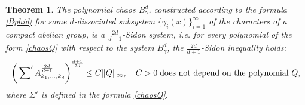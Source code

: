 \documentclass[12pt]{article}
\newtheorem{theorem}{Theorem}  %
\begin{document}
	\begin{theorem} \label{THEOREM-2} 
		The polynomial chaos $B^d_{\gamma}$, constructed according to the formula \eqref{Bphid} for some $d$-dissociated subsystem $\{\gamma_{i}(x)\}_{i=1}^{\infty}$ of the characters of a compact abelian group, is a $\frac{2d}{d+1}$-Sidon system, i.e. for every polynomial of the form \eqref{chaosQ} with respect to the system $B^d_{\gamma}$, the $\frac{2d}{d+1}$-Sidon inequality holds:
		\begin{equation} \label{THEOREM-2-eq}
			\left(\sideset{}{'}{\sum} A_{k_1, \ldots, k_d}^{\frac{2d}{d+1}}\right)^{\frac{d+1}{2d}} \le C\|Q\|_{\infty}, \quad C>0 \; \text{does not depend on the polynomial $Q$},
		\end{equation}
		where $\Sigma'$ is defined in the formula \eqref{chaosQ}.
	\end{theorem}
\end{document}
